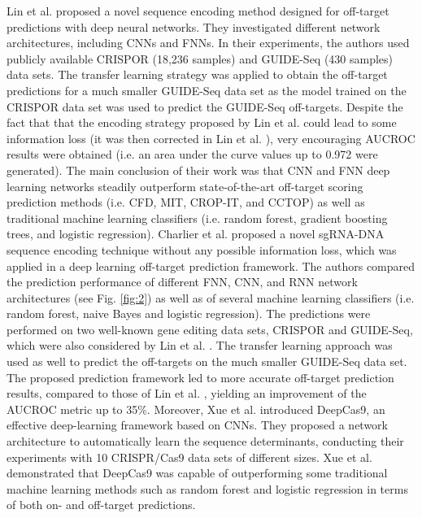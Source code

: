\documentclass[unnumsec,webpdf,contemporary,large]{oup-authoring-template}
\theoremstyle{thmstyleone}%
\theoremstyle{thmstyletwo}%
\theoremstyle{thmstylethree}%
\begin{document}
Lin et al.\cite{lin2018off} proposed a novel sequence encoding method designed for off-target predictions with deep neural networks. They investigated different network architectures, including CNNs and FNNs. In their experiments, the authors used publicly available CRISPOR (18,236 samples) and GUIDE-Seq (430 samples) data sets. The transfer learning strategy was applied to obtain the off-target predictions for a much smaller GUIDE-Seq data set as the model trained on the CRISPOR data set was used to predict the GUIDE-Seq off-targets. Despite the fact that that the encoding strategy proposed by Lin et al. \cite{lin2018off} could lead to some information loss (it was then corrected in Lin et al. \cite{lin2020crispr}), very encouraging AUCROC results were obtained (i.e. an area under the curve values up to 0.972 were generated). The main conclusion of their work was that CNN and FNN deep learning networks steadily outperform state-of-the-art off-target scoring prediction methods (i.e. CFD, MIT, CROP-IT, and CCTOP) as well as traditional machine learning classifiers (i.e. random forest, gradient boosting trees, and logistic regression). Charlier et al. \citep{charlier2021accurate} proposed a novel sgRNA-DNA sequence encoding technique without any possible information loss, which was applied in a deep learning off-target prediction framework. The authors compared the prediction performance of different FNN, CNN, and RNN network architectures (see Fig. \ref{fig:2}) as well as of several machine learning classifiers (i.e. random forest, naive Bayes and logistic regression). The predictions were performed on two well-known gene editing data sets, CRISPOR and GUIDE-Seq, which were also considered by Lin et al. \cite{lin2018off}. The transfer learning approach was used as well to predict the off-targets on the much smaller GUIDE-Seq data set. The proposed prediction framework led to more accurate off-target prediction results, compared to those of Lin et al. \cite{lin2018off}, yielding an improvement of the AUCROC metric up to 35\%. 
Moreover, Xue et al. \cite{xue2018prediction} introduced DeepCas9, an effective deep-learning framework based on CNNs. They proposed a network architecture to automatically learn the sequence determinants, conducting their experiments with 10 CRISPR/Cas9 data sets of different sizes. Xue et al. demonstrated that DeepCas9 was capable of outperforming some traditional machine learning methods such as random forest and logistic regression in terms of both on- and off-target predictions.
\end{document}
